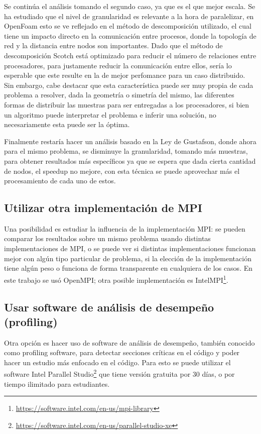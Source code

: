 \documentclass{article}
\begin{document}
Se continúa el análisis tomando el segundo caso, ya que es el que mejor escala. Se ha  estudiado que el nivel de granularidad es relevante a la hora de paralelizar, en OpenFoam esto se ve reflejado en el método de descomposición utilizado, el cual tiene un impacto directo en la comunicación entre procesos, donde la topología de red y la distancia entre nodos son importantes. Dado que el método de descomposición Scotch está optimizado para reducir el número de relaciones entre procesadores, para justamente reducir la comunicación entre ellos, sería lo esperable que este resulte en la de mejor perfomance para un caso distribuido. Sin embargo, cabe destacar que esta característica puede ser muy propia de cada problema a resolver, dada la geometría o simetría del mismo, las diferentes formas de distribuir las muestras para ser entregadas a los procesadores, si bien un algoritmo puede interpretar el problema e inferir una solución, no necesariamente esta puede ser la óptima.

Finalmente restaría hacer un análisis basado en la Ley de Gustafson, donde ahora para el mismo problema, se disminuye la granularidad, tomando más muestras, para obtener resultados más específicos ya que se espera que dada cierta cantidad de nodos, el speedup no mejore, con esta técnica se puede aprovechar más el procesamiento de cada uno de estos.
\subsection{Utilizar otra implementación de MPI}
Una posibilidad es estudiar la influencia de la implementación MPI: se pueden comparar los resultados sobre un mismo problema usando distintas implementaciones de MPI, o se puede ver si distintas implementaciones funcionan mejor con algún tipo particular de problema, si la elección de la implementación tiene algún peso o funciona de forma transparente en cualquiera de los casos. En este trabajo se usó OpenMPI; otra posible implementación es IntelMPI\footnote{\url{https://software.intel.com/en-us/mpi-library}}.

\subsection{Usar software de análisis de desempeño (profiling)}
Otra opción es hacer uso de software de análisis de desempeño, también conocido como profiling software, para detectar secciones críticas en el código y poder hacer un estudio más enfocado en el código. Para esto se puede utilizar el software Intel Parallel Studio\footnote{\url{https://software.intel.com/en-us/parallel-studio-xe}} que tiene versión gratuita por 30 días, o por tiempo ilimitado para estudiantes.
\end{document}
